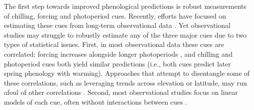 \documentclass[11pt,letter]{article}
\begin{document}
The first step towards improved phenological predictions is robust measurements of chilling, forcing and photoperiod cues. Recently, efforts have focused on estimating these cues from long-term observational data \citep{Luedeling2009,lued2013diff}. Yet observational studies may struggle to robustly estimate any of the three major cues due to two types of statistical issues. First, in most observational data these cues are correlated: forcing increases alongside longer photoperiods \citep{sarahailene2020}, and chilling and photoperiod cues both yield similar predictions (i.e., both cues predict later spring phenology with warming). Approaches that attempt to disentangle some of these correlations, such as leveraging trends across elevation or latitude, may run afoul of other correlations \citep[][]{tansey2017}. Second, most observational studies focus on linear models of each cue, often without interactions between cues \citep{visser2001,polgar2014,asse2018}.\\ %

\end{document}
